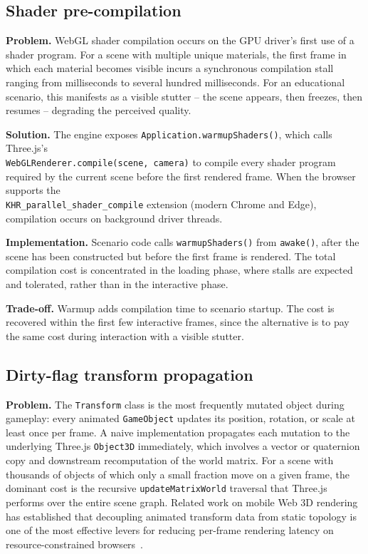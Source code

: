\subsection{Shader pre-compilation}
\textbf{Problem.} WebGL shader compilation occurs on the GPU driver's first use of a shader program. For a scene with multiple unique materials, the first frame in which each material becomes visible incurs a synchronous compilation stall ranging from milliseconds to several hundred milliseconds. For an educational scenario, this manifests as a visible stutter -- the scene appears, then freezes, then resumes -- degrading the perceived quality.

\textbf{Solution.} The engine exposes \texttt{Application.warmupShaders()}, which calls Three.js's
\\
\texttt{WebGLRenderer.compile(scene, camera)} to compile every shader program required by the current scene before the first rendered frame. When the browser supports the
\\\texttt{KHR\_parallel\_shader\_compile} extension (modern Chrome and Edge), compilation occurs on background driver threads.

\textbf{Implementation.} Scenario code calls \texttt{warmupShaders()} from \texttt{awake()}, after the scene has been constructed but before the first frame is rendered. The total compilation cost is concentrated in the loading phase, where stalls are expected and tolerated, rather than in the interactive phase.

\textbf{Trade-off.} Warmup adds compilation time to scenario startup. The cost is recovered within the first few interactive frames, since the alternative is to pay the same cost during interaction with a visible stutter.

\subsection{Dirty-flag transform propagation}
\textbf{Problem.} The \texttt{Transform} class is the most frequently mutated object during gameplay: every animated \texttt{GameObject} updates its position, rotation, or scale at least once per frame. A naive implementation propagates each mutation to the underlying Three.js \texttt{Object3D} immediately, which involves a vector or quaternion copy and downstream recomputation of the world matrix. For a scene with thousands of objects of which only a small fraction move on a given frame, the dominant cost is the recursive \texttt{updateMatrixWorld} traversal that Three.js performs over the entire scene graph. Related work on mobile Web 3D rendering has established that decoupling animated transform data from static topology is one of the most effective levers for reducing per-frame rendering latency on resource-constrained browsers~\cite{Li2020}.

